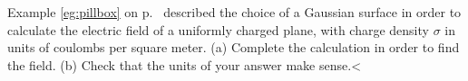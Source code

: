 Example \ref{eg:pillbox} on p.~\pageref{eg:pillbox} described the choice of a Gaussian surface
in order to calculate the electric field of a uniformly charged plane, with charge
density $\sigma$ in units of coulombs per square meter. (a) Complete the calculation in order
to find the field. (b) Check that the units of your answer make sense.<%
